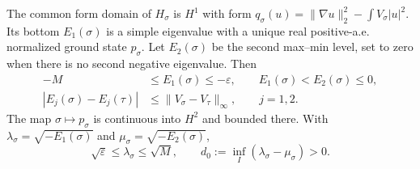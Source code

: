 \begin{proposition}
  \label{P:compact-ground-family}
  The common form domain of $H_\sigma$ is $H^1$ with form $q_\sigma(u) =
  \|\nabla u\|_2^2-\int V_\sigma|u|^2$. Its bottom $E_1(\sigma)$ is a simple
  eigenvalue with a unique real positive-a.e. normalized ground state
  $p_\sigma$. Let $E_2(\sigma)$ be the second max--min level, set to zero when
  there is no second negative eigenvalue. Then
  \begin{align}
    -M&\le E_1(\sigma)\le-\varepsilon,\qquad
    E_1(\sigma)<E_2(\sigma)\le0,\label{E:compact-energy-levels}\\
    |E_j(\sigma)-E_j(\tau)|
    &\le\|V_\sigma-V_\tau\|_\infty,\qquad j=1,2.
    \label{E:compact-level-continuity}
  \end{align}
  The map $\sigma\mapsto p_\sigma$ is continuous into $H^2$ and bounded there.
  With $\lambda_\sigma = \sqrt{-E_1(\sigma)}$ and $\mu_\sigma =
  \sqrt{-E_2(\sigma)}$,
  \begin{equation}\label{E:compact-rate-gap}
    \sqrt\varepsilon\le\lambda_\sigma\le\sqrt M,\qquad
    d_0:=\inf_I(\lambda_\sigma-\mu_\sigma)>0.
  \end{equation}
\end{proposition}

